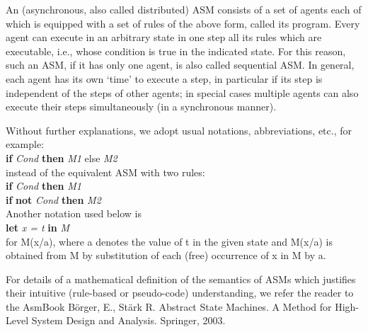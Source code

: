 An (asynchronous, also called distributed) ASM consists of a set of agents each of which is equipped with a set of rules of the above form, called its program. Every agent can execute in an arbitrary state in one step all its rules which are executable, i.e., whose condition is true in the indicated state. For this reason, such an ASM, if it has only one agent, is also called sequential ASM. In general, each agent has its own ‘time’ to execute a step, in particular if its step is independent of the steps of other agents;  in special cases multiple agents can also execute their steps simultaneously (in a synchronous manner).\

Without further explanations, we adopt usual notations, abbreviations, etc., for example:\\
\textbf{if} \textit{Cond} \textbf{then} \textit{M1} else \textit{M2}\\
instead of the equivalent ASM with two rules:\\
\textbf{if} \textit{Cond} \textbf{then} \textit{M1} \\
\textbf{if} \textbf{not} \textit{Cond} \textbf{then} \textit{M2}\\
Another notation used below is\\
\textbf{let} \textit{x = t} \textbf{in} \textit{M}\\
for M(x/a), where a denotes the value of t in the given state and M(x/a) is obtained from M by substitution of each (free) occurrence of x in M by a.

For details of a mathematical definition of the semantics of ASMs which justifies their intuitive (rule-based or pseudo-code) understanding, we refer the reader to the AsmBook Börger, E., Stärk R. Abstract State Machines. A Method for High-Level System Design and Analysis. Springer, 2003.






